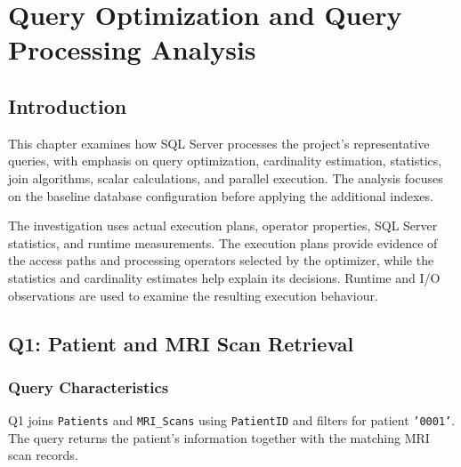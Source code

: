 \lstset{style=tsql}

\chapter{Query Optimization and Query Processing Analysis}
\label{chap:query-processing}

\section{Introduction}

This chapter examines how SQL Server processes the project's representative queries, with emphasis on query optimization, cardinality estimation, statistics, join algorithms, scalar calculations, and parallel execution. The analysis focuses on the baseline database configuration before applying the additional indexes.

The investigation uses actual execution plans, operator properties, SQL Server statistics, and runtime measurements. The execution plans provide evidence of the access paths and processing operators selected by the optimizer, while the statistics and cardinality estimates help explain its decisions. Runtime and I/O observations are used to examine the resulting execution behaviour.


\section{Q1: Patient and MRI Scan Retrieval}

\subsection{Query Characteristics}

Q1 joins \texttt{Patients} and \texttt{MRI\_Scans} using \texttt{PatientID} and filters for patient \texttt{'0001'}. The query returns the patient's information together with the matching MRI scan records.

